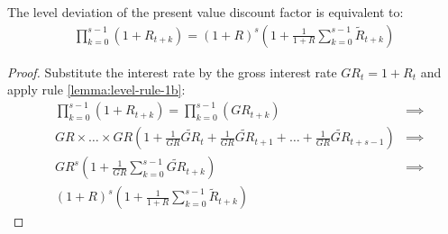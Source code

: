 \documentclass[
thesis.tex
]{subfiles}
\begin{document}

\begin{lemma}\label{product-operator}
	
	The level deviation of the present value discount factor is equivalent to:
	\begin{align}
		\label{eq:product-operator}
		\prod_{k=0}^{s-1}(1+R_{t+k}) = (1 + R)^s \left( 1 + \frac{1}{1 + R} \sum_{k=0}^{s-1} \widetilde{R}_{t+k} \right)
	\end{align}
	
	\begin{proof}
		Substitute the interest rate by the gross interest rate $GR_t = 1 + R_t$ and apply rule \ref{lemma:level-rule-1b}:
		\begin{align*}
			& \prod_{k=0}^{s-1}(1+R_{t+k}) = \prod_{k=0}^{s-1}(GR_{t+k})
			&\implies \nonumber \\
			& GR \times \dots \times GR \left( 1 + \frac{1}{GR} \widetilde{GR}_t + \frac{1}{GR} \widetilde{GR}_{t+1} + \dots + \frac{1}{GR} \widetilde{GR}_{t+s-1} \right)
			&\implies \nonumber \\
			& GR^s \left( 1 + \frac{1}{GR} \sum_{k=0}^{s-1} \widetilde{GR}_{t+k} \right)
			&\implies \nonumber \\
			& (1 + R)^s \left( 1 + \frac{1}{1 + R} \sum_{k=0}^{s-1} \widetilde{R}_{t+k} \right) &\,
		\end{align*}
	\end{proof}
	
\end{lemma}


\end{document}
